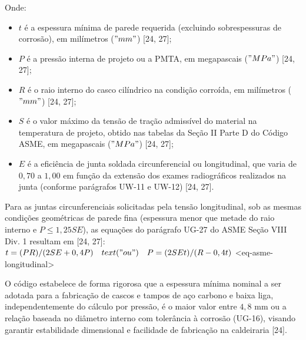 Onde:

\begin{itemize}
  \item $t$ é a espessura mínima de parede requerida (excluindo sobrespessuras de corrosão), em milímetros ($"mm"$) [24, 27];
\end{itemize}

\begin{itemize}
  \item $P$ é a pressão interna de projeto ou a PMTA, em megapascais ($"MPa"$) [24, 27];
\end{itemize}

\begin{itemize}
  \item $R$ é o raio interno do casco cilíndrico na condição corroída, em milímetros ($"mm"$) [24, 27];
\end{itemize}

\begin{itemize}
  \item $S$ é o valor máximo da tensão de tração admissível do material na temperatura de projeto, obtido nas tabelas da Seção II Parte D do Código ASME, em megapascais ($"MPa"$) [24, 27];
\end{itemize}

\begin{itemize}
  \item $E$ é a eficiência de junta soldada circunferencial ou longitudinal, que varia de $0,70$ a $1,00$ em função da extensão dos exames radiográficos realizados na junta (conforme parágrafos UW-11 e UW-12) [24, 27].
\end{itemize}

Para as juntas circunferenciais solicitadas pela tensão longitudinal, sob as mesmas condições geométricas de parede fina (espessura menor que metade do raio interno e $P \le  1,25 S E$), as equações do parágrafo UG-27 do ASME Seção VIII Div. 1 resultam em [24, 27]:
$ t = (P R) / (2 S E + 0,4 P) \quad text("ou") \quad P = (2 S E t) / (R - 0,4 t) $ <eq-asme-longitudinal>

O código estabelece de forma rigorosa que a espessura mínima nominal a ser adotada para a fabricação de cascos e tampos de aço carbono e baixa liga, independentemente do cálculo por pressão, é o maior valor entre $4,8$ mm ou a relação baseada no diâmetro interno com tolerância à corrosão (UG-16), visando garantir estabilidade dimensional e facilidade de fabricação na caldeiraria [24].


